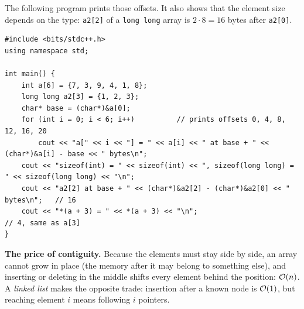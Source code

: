 \begin{diagrambox}
\end{diagrambox}

The following program prints those offsets. It also shows that the element size depends on the type: \texttt{a2[2]} of a \texttt{long long} array is $2\cdot 8 = 16$ bytes after \texttt{a2[0]}.

\begin{lstlisting}[style=cpp]
#include <bits/stdc++.h>
using namespace std;

int main() {
    int a[6] = {7, 3, 9, 4, 1, 8};
    long long a2[3] = {1, 2, 3};
    char* base = (char*)&a[0];
    for (int i = 0; i < 6; i++)          // prints offsets 0, 4, 8, 12, 16, 20
        cout << "a[" << i << "] = " << a[i] << " at base + " << (char*)&a[i] - base << " bytes\n";
    cout << "sizeof(int) = " << sizeof(int) << ", sizeof(long long) = " << sizeof(long long) << "\n";
    cout << "a2[2] at base + " << (char*)&a2[2] - (char*)&a2[0] << " bytes\n";   // 16
    cout << "*(a + 3) = " << *(a + 3) << "\n";                                  // 4, same as a[3]
}
\end{lstlisting}

\textbf{The price of contiguity.} Because the elements must stay side by side, an array cannot grow in place (the memory after it may belong to something else), and inserting or deleting in the middle shifts every element behind the position: $\mathcal{O}(n)$. A \emph{linked list} makes the opposite trade: insertion after a known node is $\mathcal{O}(1)$, but reaching element $i$ means following $i$ pointers.

